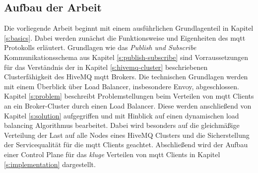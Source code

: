 \subsection{Aufbau der Arbeit}
Die vorliegende Arbeit beginnt mit einem ausführlichen Grundlagenteil in Kapitel \ref{s:basics}. Dabei werden zunächst die Funktionsweise und Eigenheiten des \ac{mqtt} Protokolls erläutert.
Grundlagen wie das \textit{Publish und Subscribe} Kommunikationsschema aus Kapitel \ref{s:publish-subscribe} sind Vorraussetzungen für das Verständnis der in Kapitel \ref{s:hivemq-cluster} beschriebenen Clusterfähigkeit des HiveMQ \acs{mqtt} Brokers.
Die technischen Grundlagen werden mit einem Überblick über Load Balancer, insbesondere Envoy, abgeschlossen.
Kapitel \ref{s:problem} beschreibt Problemstellungen beim Verteilen von \ac{mqtt} Clients an ein Broker-Cluster durch einen Load Balancer.
Diese werden anschlie{\ss}end von Kapitel \ref{s:solution} aufgegriffen und mit Hinblick auf einen dynamischen load balancing Algorithmus bearbeitet. Dabei wird besonders auf die gleichmä{\ss}ige Verteilung der Last auf alle Nodes eines HiveMQ Clusters und die Sicherstellung der Servicequalität für die \ac{mqtt} Clients geachtet.
Abschlie{\ss}end wird der Aufbau einer Control Plane für das \textit{kluge} Verteilen von \ac{mqtt} Clients in Kapitel \ref{s:implementation} dargestellt.

\newpage

\begin{comment}
- Outline your work such that readers who have not read subsequent chapters get an idea of what
  - your "problem domain" is (e.g. the software quality department of some company or the overarching research project you are working in)
  - the situation is (e.g. software tests at some company are done in complete manual fash-ion)
  - the complication / problem is (e.g. hotfixes have to be deployed totally untested in pro-duction)
  - what your approach is (e.g. establishing a concept and tool evaluation for continuously improving code coverage of automated tests)
  - what beyond the scope of your thesis is (e.g. also implementing a CICD pipeline)
  - what the actual core results are (e.g. how many tools have been evaluated)

From that it must clear, what your thesis'contribution actually is. Please delineate your contribution from every concept, method, tool, framework or whatever implementation your thesis took for granted and is built upon.

This chapter deliberately anticipates contents of the latter chapters but please refrain from spe-cific technical termsof your application domain or solution here. Trade technical accuracy for com-mon comprehensibility here. Write this chapter as a "management summary" and do not spend more than two to three pages here.

Also explain structure of your thesis, i.e., summarize the contents of each chapter in one sentence or paragraph and describe the overarching storyline, i.e., how chapters build upon each other.
\end{comment}
